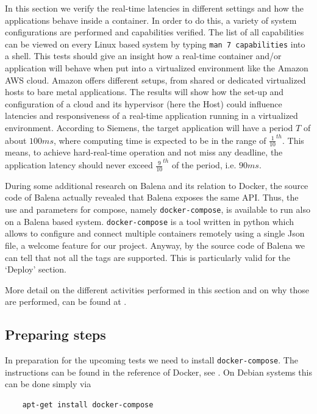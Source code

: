\documentclass[]{scrartcl}
\begin{document}
In this section we verify the real-time latencies in different settings and how the applications behave inside a container. In order to do this, a variety of system configurations are performed and capabilities verified. The list of all capabilities can be viewed on every Linux based system by typing \texttt{man 7 capabilities} into a shell. This tests should give an insight how a real-time container and/or application will behave when put into a virtualized environment like the Amazon AWS cloud. Amazon offers different setups, from shared or dedicated virtualized hosts to bare metal applications. The results will show how the set-up and configuration of a cloud and its  hypervisor (here the Host) could influence latencies and responsiveness of a real-time application running in a virtualized environment. According to Siemens, the target application will have a period $T$ of about $100 ms$, where computing time is expected to be in the range of $\frac{1}{10}^{th}$. This means, to achieve hard-real-time operation and not miss any deadline, the application latency should never exceed $\frac{9}{10}^{th}$ of the period, i.e. $90 ms$.

During some additional research on Balena and its relation to Docker, the source code of Balena actually revealed that Balena exposes the same API. Thus, the use and parameters for compose, namely \texttt{docker-compose}, is available to run also on a Balena based system.
\texttt{docker-compose} is a tool written in python which allows to configure and connect multiple containers remotely using a single Json file, a welcome feature for our project.
Anyway, by the source code of Balena we can tell that not all the tags are supported. This is particularly valid for the `Deploy' section. 

More detail on the different activities performed in this section and on why those are performed, can be found at \cite{lrt01}.

\subsection{Preparing steps}

In preparation for the upcoming tests we need to install \texttt{docker-compose}.
The instructions can be found in the reference of Docker, see \cite{docker05}. 
On Debian systems this can be done simply via 

\begin{verbatim}
	apt-get install docker-compose
\end{verbatim}
\end{document}
